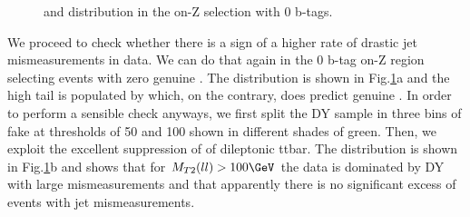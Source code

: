 \begin{figure}[!hbtp]
\caption{ \ETmiss and \mtll distribution in the on-Z selection with 0 b-tags.}
\label{fig:met_tail_controlPlots}
\end{figure}

We proceed to check whether there is a sign of a higher rate of drastic jet mismeasurements in data. We can do that again in the 0 b-tag on-Z region selecting events
with zero genuine \ETmiss. The \ETmiss distribution is shown in Fig.\ref{fig:met_tail_controlPlots}a and the high \ETmiss tail is populated by \ttbar which, on the contrary, does predict genuine 
\ETmiss. In order to perform a sensible check anyways, we first split the DY sample in three bins of fake \ETmiss at thresholds of 50 \GeV and 100 \GeV shown in different shades of green.
Then, we exploit the excellent suppression of \mtll of dileptonic ttbar. The \mtll distribution is shown in Fig.\ref{fig:met_tail_controlPlots}b and shows that for $\mtll>100 \GeV$ the 
data is dominated by DY with large mismeasurements and that apparently there is no significant excess of events with jet mismeasurements.

